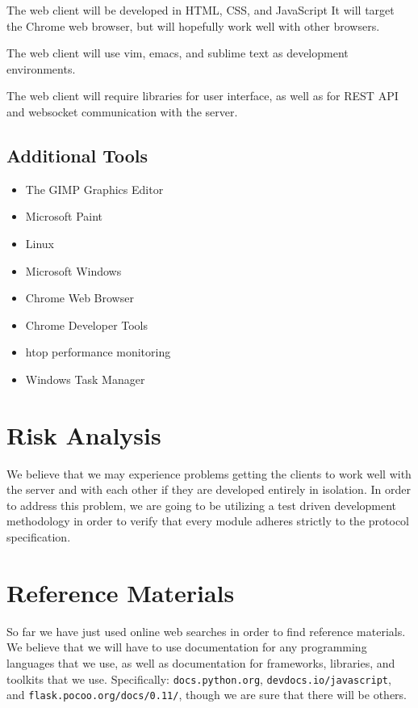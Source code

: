 \documentclass[11pt]{article}
\begin{document}
The web client will be developed in HTML, CSS, and JavaScript It will
target the Chrome web browser, but will hopefully work well with other
browsers.

The web client will use vim, emacs, and sublime text as development
environments.

The web client will require libraries for user interface, as well as
for REST API and websocket communication with the server.

\subsection{Additional Tools}
\label{sec-6-2}

\begin{itemize}
\item The GIMP Graphics Editor
\item Microsoft Paint
\item Linux
\item Microsoft Windows
\item Chrome Web Browser
\item Chrome Developer Tools
\item htop performance monitoring
\item Windows Task Manager
\end{itemize}

\section{Risk Analysis}
\label{sec-7}

We believe that we may experience problems getting the clients to work
well with the server and with each other if they are developed
entirely in isolation. In order to address this problem, we are going
to be utilizing a test driven development methodology in order to
verify that every module adheres strictly to the protocol
specification.

\section{Reference Materials}
\label{sec-8}

So far we have just used online web searches in order to find
reference materials. We believe that we will have to use
documentation for any programming languages that we use, as well as
documentation for frameworks, libraries, and toolkits that we
use. Specifically: \texttt{docs.python.org}, \texttt{devdocs.io/javascript}, and
\texttt{flask.pocoo.org/docs/0.11/}, though we are sure that there will be
others.
\end{document}
